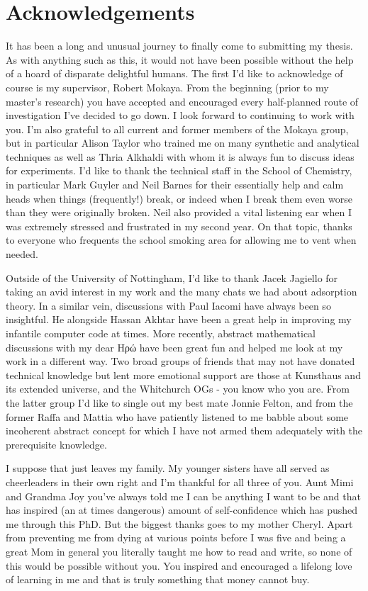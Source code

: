 \cleardoublepage

\chapter*{Acknowledgements}

It has been a long and unusual journey to finally come to submitting my thesis. As with anything such as this, it would not have been possible without the help of a hoard of disparate delightful humans. The first I'd like to acknowledge of course is my supervisor, Robert Mokaya. From the beginning (prior to my master's research) you have accepted and encouraged every half-planned route of investigation I've decided to go down. I look forward to continuing to work with you. I'm also grateful to all current and former members of the Mokaya group, but in particular Alison Taylor who trained me on many synthetic and analytical techniques as well as Thria Alkhaldi with whom it is always fun to discuss ideas for experiments. I'd like to thank the technical staff in the School of Chemistry, in particular Mark Guyler and Neil Barnes for their essentially help and calm heads when things (frequently!) break, or indeed when I break them even worse than they were originally broken. Neil also provided a vital listening ear when I was extremely stressed and frustrated in my second year. On that topic, thanks to everyone who frequents the school smoking area for allowing me to vent when needed.

Outside of the University of Nottingham, I'd like to thank Jacek Jagiello for taking an avid interest in my work and the many chats we had about adsorption theory. In a similar vein, discussions with Paul Iacomi have always been so insightful. He alongside Hassan Akhtar have been a great help in improving my infantile computer code at times. More recently, abstract mathematical discussions with my dear \textgreek{Ηρώ} have been great fun and helped me look at my work in a different way. Two broad groups of friends that may not have donated technical knowledge but lent more emotional support are those at Kunsthaus and its extended universe, and the Whitchurch OGs - you know who you are. From the latter group I'd like to single out my best mate Jonnie Felton, and from the former Raffa and Mattia who have patiently listened to me babble about some incoherent abstract concept for which I have not armed them adequately with the prerequisite knowledge.

I suppose that just leaves my family. My younger sisters have all served as cheerleaders in their own right and I'm thankful for all three of you. Aunt Mimi and Grandma Joy you've always told me I can be anything I want to be and that has inspired (an at times dangerous) amount of self-confidence which has pushed me through this PhD. But the biggest thanks goes to my mother Cheryl. Apart from preventing me from dying at various points before I was five and being a great Mom in general you literally taught me how to read and write, so none of this would be possible without you. You inspired and encouraged a lifelong love of learning in me and that is truly something that money cannot buy. 